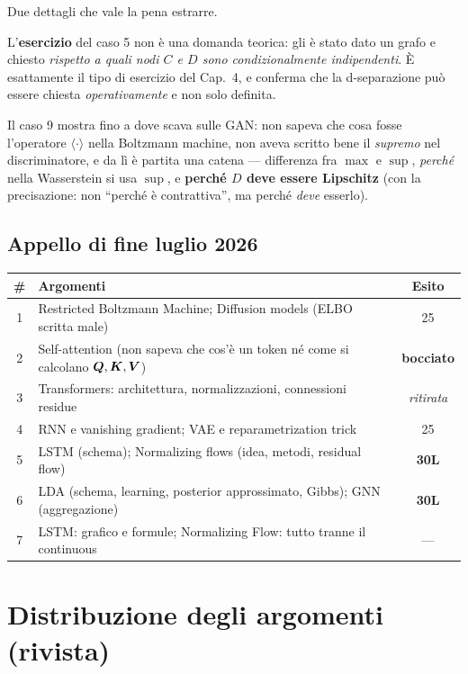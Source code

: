 \noindent Due dettagli che vale la pena estrarre.

L'\textbf{esercizio} del caso 5 non è una domanda teorica: gli è stato dato un grafo e chiesto \emph{rispetto a quali nodi $C$ e $D$ sono condizionalmente indipendenti}. È esattamente il tipo di esercizio del Cap.~4, e conferma che la d-separazione può essere chiesta \emph{operativamente} e non solo definita.

Il caso 9 mostra fino a dove scava sulle GAN: non sapeva che cosa fosse l'operatore $\langle\cdot\rangle$ nella Boltzmann machine, non aveva scritto bene il \emph{supremo} nel discriminatore, e da lì è partita una catena — differenza fra $\max$ e $\sup$, \emph{perché} nella Wasserstein si usa $\sup$, e \textbf{perché $D$ deve essere Lipschitz} (con la precisazione: non ``perché è contrattiva'', ma perché \emph{deve} esserlo).

\subsection*{Appello di fine luglio 2026}

\begin{center}
\begin{tabular}{clc}
\toprule
\# & \textbf{Argomenti} & \textbf{Esito} \\
\midrule
1 & Restricted Boltzmann Machine; Diffusion models (ELBO scritta male) & 25 \\
2 & Self-attention (non sapeva che cos'è un token né come si calcolano $\bm{Q},\bm{K},\bm{V}$) & \textbf{bocciato} \\
3 & Transformers: architettura, normalizzazioni, connessioni residue & \emph{ritirata} \\
4 & RNN e vanishing gradient; VAE e reparametrization trick & 25 \\
5 & LSTM (schema); Normalizing flows (idea, metodi, residual flow) & \textbf{30L} \\
6 & LDA (schema, learning, posterior approssimato, Gibbs); GNN (aggregazione) & \textbf{30L} \\
7 & LSTM: grafico e formule; Normalizing Flow: tutto tranne il continuous & --- \\
\bottomrule
\end{tabular}
\end{center}

\section{Distribuzione degli argomenti (rivista)}


